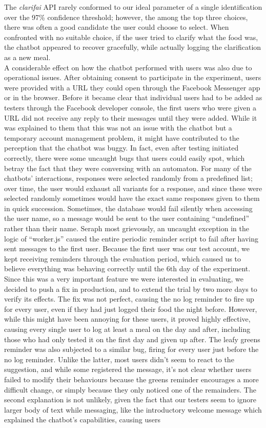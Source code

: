 The \textit{clarifai} API rarely conformed to our ideal parameter of a single identification over the 97\% confidence threshold; however, the among the top three choices, there was often a good candidate the user could choose to select. When confronted with no suitable choice, if the user tried to clarify what the food was, the chatbot appeared to recover gracefully, while actually logging the clarification as a new meal. \\
A considerable effect on how the chatbot performed with users was also due to operational issues. After obtaining consent to participate in the experiment, users were provided with a URL they could open through the Facebook Messenger app or in the browser. Before it became clear that individual users had to be added as testers through the Facebook developer console, the first users who were given a URL did not receive any reply to their messages until they were added. While it was explained to them that this was not an issue with the chatbot but a temporary account management problem, it might have contributed to the perception that the chatbot was buggy. In fact, even after testing initiated correctly, there were some uncaught bugs that users could easily spot, which betray the fact that they were conversing with an automaton. For many of the chatbots' interactions, responses were selected randomly from a predefined list; over time, the user would exhaust all variants for a response, and since these were selected randomly sometimes would have the exact same responses given to them in quick succession. Sometimes, the database would fail silently when accessing the user name, so a message would be sent to the user containing ``undefined'' rather than their name. Seraph most grievously, an uncaught exception in the logic of ``worker.js'' caused the entire periodic reminder script to fail after having sent messages to the first user. Because the first user was our test account, we kept receiving reminders through the evaluation period, which caused us to believe everything was behaving correctly until the 6th day of the experiment. Since this was a very important feature we were interested in evaluating, we decided to push a fix in production, and to extend the trial by two more days to verify its effects. The fix was not perfect, causing the no log reminder to fire up for every user, even if they had just logged their food the night before. However, while this might have been annoying for these users, it proved highly effective, causing every single user to log at least a meal on the day and after, including those who had only tested it on the first day and given up after. The leafy greens reminder was also subjected to a similar bug, firing for every user just before the no log reminder. Unlike the latter, most users didn't seem to react to the suggestion, and while some registered the message, it's not clear whether users failed to modify their behaviours because the greens reminder encourages a more difficult change, or simply because they only noticed one of the remainders. The second explanation is not unlikely, given the fact that our testers seem to ignore larger body of text while messaging, like the introductory welcome message which explained the chatbot's capabilities, causing users 